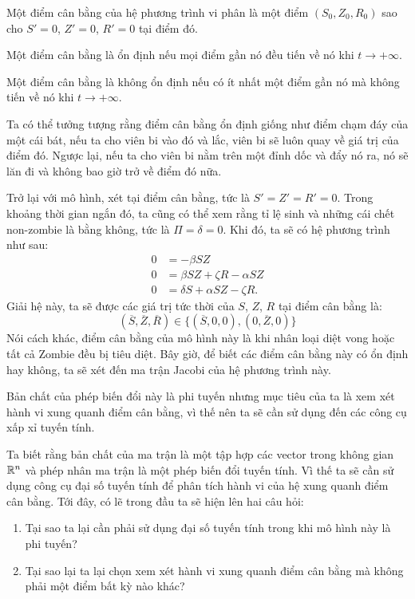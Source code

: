 \documentclass[12pt]{scrartcl}
\begin{document}
\begin{definition}
    Một điểm cân bằng của hệ phương trình vi phân là một điểm $(S_0, Z_0, R_0)$ sao cho $S' = 0$, $Z' = 0$, $R' = 0$ tại điểm đó.
\end{definition}
\begin{definition}
    Một điểm cân bằng là ổn định nếu mọi điểm gần nó đều tiến về nó khi $t \to +\infty$.
\end{definition}
\begin{definition}
    Một điểm cân bằng là không ổn định nếu có ít nhất một điểm gần nó mà không tiến về nó khi $t \to +\infty$.
\end{definition}
Ta có thể tưởng tượng rằng điểm cân bằng ổn định giống như điểm chạm đáy của một cái bát, nếu ta cho viên bi vào đó và lắc, viên bi sẽ luôn quay về giá trị của điểm đó. Ngược lại, nếu ta cho viên bi nằm trên một đỉnh dốc và đẩy nó ra, nó sẽ lăn đi và không bao giờ trở về điểm đó nữa.

Trở lại với mô hình, xét tại điểm cân bằng, tức là $S' = Z' = R' = 0$. Trong khoảng thời gian ngắn đó, ta cũng có thể xem rằng tỉ lệ sinh và những cái chết non-zombie là bằng không, tức là $\Pi = \delta = 0$. Khi đó, ta sẽ có hệ phương trình như sau:
\[
    \begin{aligned}
    0 &= -\beta S Z \\
    0 &= \beta S Z+ \zeta R - \alpha S Z \\
    0 &= \delta S + \alpha S Z - \zeta R.
    \end{aligned}
\]
Giải hệ này, ta sẽ được các giá trị tức thời của $S$, $Z$, $R$ tại điểm cân bằng là:
\[
    (\overline{S}, \overline{Z}, \overline{R}) \in \{(\overline{S} ,0,0),(0,\overline{Z} ,0)\}
\]
Nói cách khác, điểm cân bằng của mô hình này là khi nhân loại diệt vong hoặc tất cả Zombie đều bị tiêu diệt. Bây giờ, để biết các điểm cân bằng này có ổn định hay không, ta sẽ xét đến ma trận Jacobi của hệ phương trình này. 

Bản chất của phép biến đổi này là phi tuyến nhưng mục tiêu của ta là xem xét hành vi xung quanh điểm cân bằng, vì thế nên ta sẽ cần sử dụng đến các công cụ xấp xỉ tuyến tính.

Ta biết rằng bản chất của ma trận là một tập hợp các vector trong không gian $\mathbb{R}^n$ và phép nhân ma trận là một phép biến đổi tuyến tính. Vì thế ta sẽ cần sử dụng công cụ đại số tuyến tính để phân tích hành vi của hệ xung quanh điểm cân bằng. Tới đây, có lẽ trong đầu ta sẽ hiện lên hai câu hỏi: 
\begin{enumerate}
    \item Tại sao ta lại cần phải sử dụng đại số tuyến tính trong khi mô hình này là phi tuyến?
    \item Tại sao lại ta lại chọn xem xét hành vi xung quanh điểm cân bằng mà không phải một điểm bất kỳ nào khác?
\end{enumerate}
\end{document}
